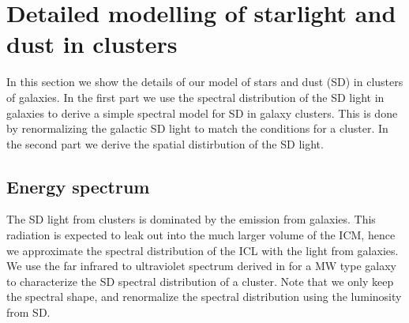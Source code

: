 \documentclass[10pt,aps,pra,reprint,amsmath,amsfonts,amssymb,showpacs,nofootinbib,floatfix]{revtex4-1}
\begin{document}
%


\vspace{-0.7cm}

%
%

\appendix

\section{Detailed modelling of starlight and dust in clusters}
\label{sect:SD}
In this section we show the details of our model of stars and dust
(SD) in clusters of galaxies. In the first part we use the spectral
distribution of the SD light in galaxies to derive a simple spectral
model for SD in galaxy clusters. This is done by renormalizing the
galactic SD light to match the conditions for a cluster. In the second
part we derive the spatial distirbution of the SD light.

\subsection{Energy spectrum}
The SD light from clusters is dominated by the emission from
galaxies. This radiation is expected to leak out into the much larger
volume of the ICM, hence we approximate the spectral distribution of
the ICL with the light from galaxies. We use the far infrared to
ultraviolet spectrum derived in \cite{2006ApJ...648L..29P} for a MW
type galaxy to characterize the SD spectral distribution of a
cluster. Note that we only keep the spectral shape, and renormalize
the spectral distribution using the luminosity from SD.
\end{document}
